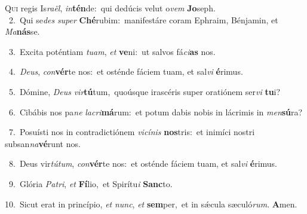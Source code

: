 \lettrine{\initial\textcolor{\initialcolor}{Q}}{ui} regis Is\-\textit{ra}\-\textit{ël}, \textit{in}\-\textbf{tén}de:~\star qui dedúcis velut o\textit{vem} \textbf{Jo}\-seph.\\
{\numbfont\textcolor{\numbcolor}{~2.}}~Qui se\textit{des} \textit{su}\-\textit{per} \textbf{Ché}\-rubim:~\star manifestáre coram Ephraim, Bénjamin, et \textit{Ma}\-\textbf{nás}se.\par
{\numbfont\textcolor{\numbcolor}{~3.}}~Excita poténtiam \textit{tu}\-\textit{am}, \textit{et} \textbf{ve}\-ni:~\star ut salvos fá\-\textit{ci}\-\textbf{as} nos.\par
{\numbfont\textcolor{\numbcolor}{~4.}}~\-\textit{De}\-\textit{us}, \textit{con}\-\textbf{vér}te nos:~\star et osténde fáciem tuam, et sal\textit{vi} \textbf{é}\-rimus.\par
{\numbfont\textcolor{\numbcolor}{~5.}}~Dómine, \textit{De}\-\textit{us} \textit{vir}\-\textbf{tú}tum,~\star quoúsque irascéris super oratiónem ser\textit{vi} \textbf{tu}\-i?\par
{\numbfont\textcolor{\numbcolor}{~6.}}~Cibábis nos pa\textit{ne} \textit{la}\-\textit{cri}\textbf{má}rum:~\star et potum dabis nobis in lácrimis in \textit{men}\-\textbf{sú}ra?\par
{\numbfont\textcolor{\numbcolor}{~7.}}~Posuísti nos in contradictiónem \textit{vi}\-\textit{cí}\textit{nis} \textbf{nos}\-tris:~\star et inimíci nostri subsan\-\textit{na}\-\textbf{vé}runt nos.\par
{\numbfont\textcolor{\numbcolor}{~8.}}~Deus vir\-\textit{tú}\-\textit{tum}, \textit{con}\-\textbf{vér}te nos:~\star et osténde fáciem tuam, et sal\textit{vi} \textbf{é}\-rimus.\par
{\numbfont\textcolor{\numbcolor}{~9.}}~Glória \textit{Pa}\-\textit{tri}, \textit{et} \textbf{Fí}\-lio,~\star et Spirítu\textit{i} \textbf{Sanc}\-to.\par
{\numbfont\textcolor{\numbcolor}{10.}}~Sicut erat in princípio, \textit{et} \textit{nunc}\-, \textit{et} \textbf{sem}\-per,~\star et in sǽcula sæculó\-\textit{rum}\-. \textbf{A}\-men.\par
